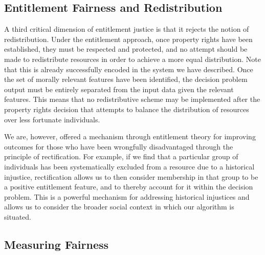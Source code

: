 \subsection{Entitlement Fairness and Redistribution}

A third critical dimension of entitlement justice is that it rejects the notion
of redistribution. Under the entitlement approach, once property rights have
been established, they must be respected and protected, and no attempt should be
made to redistribute resources in order to achieve a more equal distribution.
Note that this is already successfully encoded in the system we have described.
Once the set of morally relevant features have been identified, the decision
problem output must be entirely separated from the input data given the relevant
features. This means that no redistributive scheme may be implemented after the
property rights decision that attempts to balance the distribution of resources
over less fortunate individuals.

We are, however, offered a mechanism through entitlement theory for improving
outcomes for those who have been wrongfully disadvantaged through the principle
of rectification. For example, if we find that a particular group of individuals
has been systematically excluded from a resource due to a historical injustice,
rectification allows us to then consider membership in that group to be a
positive entitlement feature, and to thereby account for it within the decision
problem. This is a powerful mechanism for addressing historical injustices
and allows us to consider the broader social context in which our algorithm is
situated. 

\subsection{Measuring Fairness}

